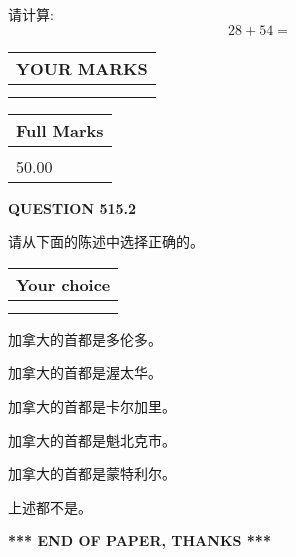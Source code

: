 \documentclass{ctexart}
\begin{document}
  
 
请计算:
\begin{equation}
28 +  %
54 = \nonumber
\end{equation}
 

 

 
  
\vspace{0.2in}
  
\noindent\begin{tabular}{|l|}
\hline
 YOUR MARKS  \\
\hline
 \\ 
 \\ 
\hline
\end{tabular}
\hspace{0.05in} \begin{tabular}{|l|}
\hline
 Full Marks  \\
\hline
 \\ 
50.00 \\
\hline
\end{tabular}
{\textbf{\Large{QUESTION
515.2 
}}}
  
  
请从下面的陈述中选择正确的。
  
  
\noindent\hspace{3.0in} \begin{tabular}{|l|}
\hline
Your choice \\
\hline
 \\ 
 \\ 
\hline
\end{tabular}
  
  
 
 
加拿大的首都是多伦多。
 
 
加拿大的首都是渥太华。
 
 
加拿大的首都是卡尔加里。
 
 
加拿大的首都是魁北克市。
 
 
加拿大的首都是蒙特利尔。
 
 
 上述都不是。
 
 
   
   
 \vspace{0.2in}
 
   
   
   
   
\vspace{1.0in} 
{\textbf{\large{ *** END OF PAPER, THANKS *** }}} 
   
\end{document}
